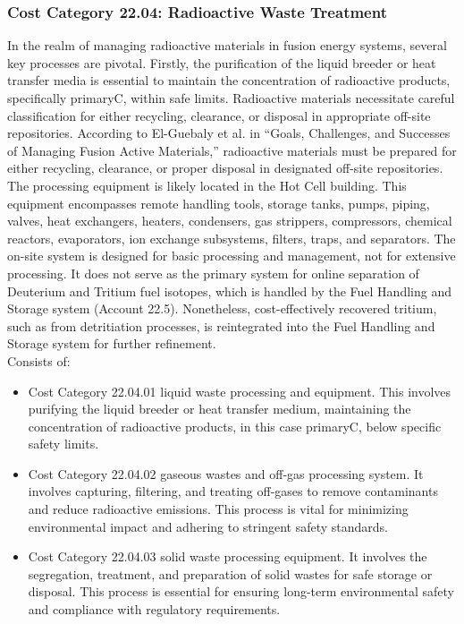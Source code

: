 
\subsubsection{Cost Category 22.04: Radioactive Waste Treatment}
In the realm of managing radioactive materials in fusion energy systems, several key processes are pivotal. Firstly, the purification of the liquid breeder or heat transfer media is essential to maintain the concentration of radioactive products, specifically primaryC, within safe limits.  Radioactive materials necessitate careful classification for either recycling, clearance, or disposal in appropriate off-site repositories.  According to El-Guebaly et al. in “Goals, Challenges, and Successes of Managing Fusion Active Materials,” \cite{Elguebaly2013} radioactive materials must be prepared for either recycling, clearance, or proper disposal in designated off-site repositories.  The processing equipment is likely located in the Hot Cell building. This equipment encompasses remote handling tools, storage tanks, pumps, piping, valves, heat exchangers, heaters, condensers, gas strippers, compressors, chemical reactors, evaporators, ion exchange subsystems, filters, traps, and separators.  The on-site system is designed for basic processing and management, not for extensive processing. It does not serve as the primary system for online separation of Deuterium and Tritium fuel isotopes, which is handled by the Fuel Handling and Storage system (Account 22.5). Nonetheless, cost-effectively recovered tritium, such as from detritiation processes, is reintegrated into the Fuel Handling and Storage system for further refinement.\\

Consists of:

\begin{itemize}
    \item Cost Category 22.04.01 liquid waste processing and equipment.  This involves purifying the liquid breeder or heat transfer medium,  maintaining the concentration of radioactive products, in this case primaryC, below specific safety limits.
    \item Cost Category 22.04.02 gaseous wastes and off-gas processing system. It involves capturing, filtering, and treating off-gases to remove contaminants and reduce radioactive emissions. This process is vital for minimizing environmental impact and adhering to stringent safety standards.
    \item Cost Category 22.04.03 solid waste processing equipment. It involves the segregation, treatment, and preparation of solid wastes for safe storage or disposal. This process is essential for ensuring long-term environmental safety and compliance with regulatory requirements.
\end{itemize}




